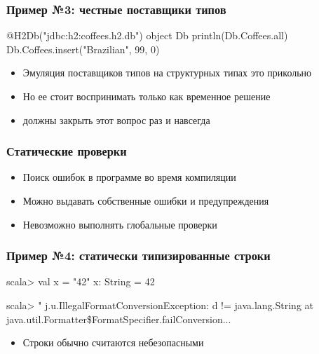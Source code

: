 \documentclass[svgnames,hyperref={bookmarks=false},11pt]{beamer}
\begin{document}
\begin{frame}[fragile]
\frametitle{Пример №3: честные поставщики типов}

\begin{semiverbatim}
\alert{@H2Db(}"jdbc:h2:coffees.h2.db"\alert{)} object Db
println(Db.Coffees.all)
Db.Coffees.insert("Brazilian", 99, 0)

\end{semiverbatim}

\begin{itemize}
\item Эмуляция поставщиков типов на структурных типах это прикольно
\item Но ее стоит воспринимать только как временное решение
\item {} должны закрыть этот вопрос раз и навсегда
\end{itemize}
\end{frame}

\begin{frame}[fragile]
\frametitle{}

\vskip40pt
\begin{center}
\end{center}
\end{frame}

\begin{frame}[fragile]
\frametitle{Статические проверки}

\begin{itemize}
\item Поиск ошибок в программе во время компиляции
\item Можно выдавать собственные ошибки и предупреждения
\item Невозможно выполнять глобальные проверки
\end{itemize}
\end{frame}

\begin{frame}[fragile]
\frametitle{Пример №4: статически типизированные строки}

\begin{semiverbatim}
scala> val x = "42"
x: String = 42

scala> "%
j.u.IllegalFormatConversionException: d != java.lang.String
  at java.util.Formatter\$FormatSpecifier.failConversion...
\end{semiverbatim}

\begin{itemize}
\item Строки обычно считаются небезопасными
\end{itemize}
\end{frame}
\end{document}
